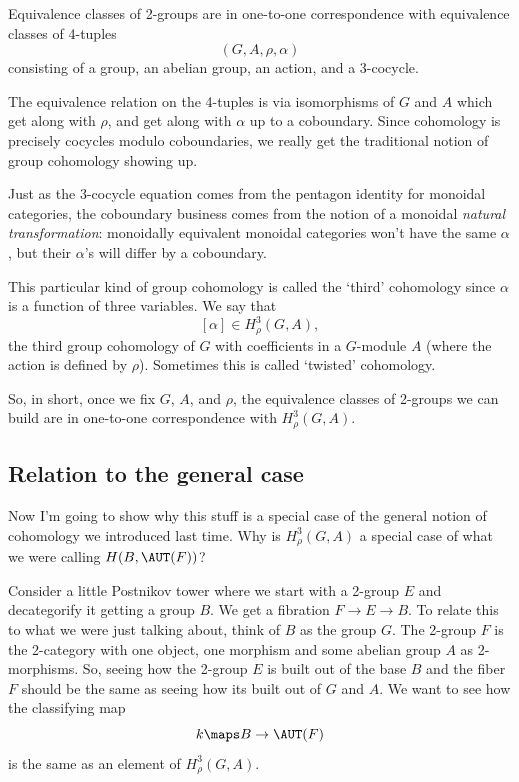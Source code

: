 \documentclass{amsart}
\begin{document}
\begin{thm}[Sinh]
  Equivalence classes of 2-groups are in one-to-one correspondence
  with equivalence classes of 4-tuples
  \[(G, A, \rho, \alpha)\]
  consisting of a group, an abelian group, an action, and a 3-cocycle.
\end{thm}

The equivalence relation on the 4-tuples is via isomorphisms of $G$ and
$A$ which get along with $\rho$, and get along with $\alpha$ up to a
coboundary.  Since cohomology is precisely cocycles modulo
coboundaries, we really get the traditional notion of group cohomology
showing up.  

Just as the 3-cocycle equation comes from the pentagon 
identity for monoidal categories, the 
coboundary business comes from the notion of a monoidal \emph{natural 
transformation}: monoidally equivalent monoidal categories won't have 
the same $\alpha$, but their $\alpha$'s will differ by a coboundary.

This particular kind of group cohomology is called the `third'
cohomology since $\alpha$ is a function of three variables.
We say that
\[
[\alpha] \in H^3_\rho(G,A),
\]
the third group cohomology of $G$ with coefficients in a $G$-module
$A$ (where the action is defined by $\rho$).  Sometimes this is called
`twisted' cohomology.  

So, in short, once we fix $G$, $A$, and $\rho$, the equivalence classes 
of 2-groups we can build are in one-to-one correspondence with 
$H^3_\rho(G,A)$. 

\subsection{Relation to the general case}
\label{sec:relat-gener-case}

Now I'm going to show why this stuff is a special case of the general
notion of cohomology we introduced last time.  Why is $H^3_\rho(G,A)$
a special case of what we were calling $H(B,\AUT(F))$?

Consider a little Postnikov tower where we start with a 2-group
$E$ and decategorify it getting a group $B$.  We get a fibration 
$F\to E\to B$.  To relate this to what we were just talking about,
think of $B$ as the group $G$.  The 2-group $F$ is the 2-category with
one object, one morphism and some abelian group $A$ as 2-morphisms.
So, seeing how the 2-group $E$ is built out of the base $B$ and the
fiber $F$ should be the same as seeing how its built out of $G$ and
$A$.  We want to see how the classifying map
\[k\maps B \to \AUT(F)\]
is the same as an element of $H^3_\rho(G,A)$.
\end{document}

